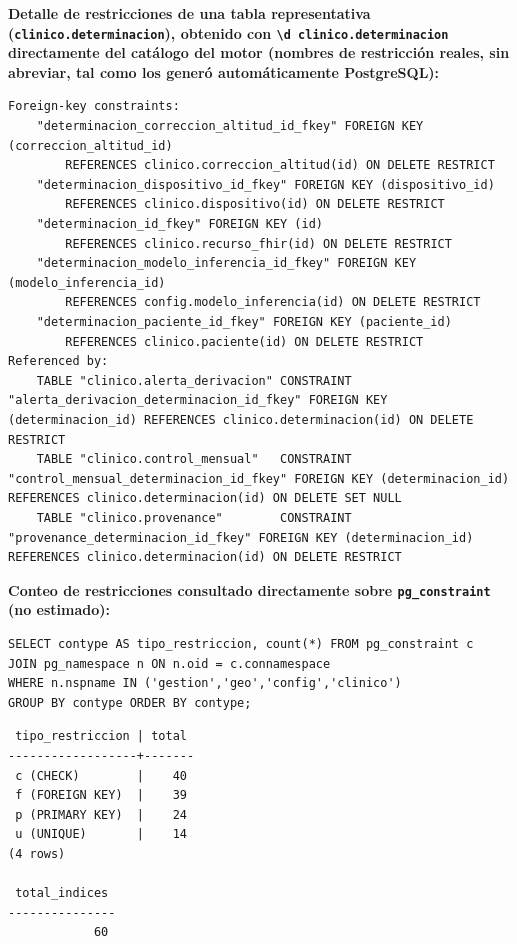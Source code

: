 \documentclass[11pt,a4paper]{article}
\begin{document}
\textbf{Detalle de restricciones de una tabla representativa (\texttt{clinico.determinacion}), obtenido con \texttt{\textbackslash{}d\ clinico.determinacion} directamente del catálogo del motor (nombres de restricción reales, sin abreviar, tal como los generó automáticamente PostgreSQL):}

\begin{samepage}\begin{verbatim}
Foreign-key constraints:
    "determinacion_correccion_altitud_id_fkey" FOREIGN KEY (correccion_altitud_id)
        REFERENCES clinico.correccion_altitud(id) ON DELETE RESTRICT
    "determinacion_dispositivo_id_fkey" FOREIGN KEY (dispositivo_id)
        REFERENCES clinico.dispositivo(id) ON DELETE RESTRICT
    "determinacion_id_fkey" FOREIGN KEY (id)
        REFERENCES clinico.recurso_fhir(id) ON DELETE RESTRICT
    "determinacion_modelo_inferencia_id_fkey" FOREIGN KEY (modelo_inferencia_id)
        REFERENCES config.modelo_inferencia(id) ON DELETE RESTRICT
    "determinacion_paciente_id_fkey" FOREIGN KEY (paciente_id)
        REFERENCES clinico.paciente(id) ON DELETE RESTRICT
Referenced by:
    TABLE "clinico.alerta_derivacion" CONSTRAINT "alerta_derivacion_determinacion_id_fkey" FOREIGN KEY (determinacion_id) REFERENCES clinico.determinacion(id) ON DELETE RESTRICT
    TABLE "clinico.control_mensual"   CONSTRAINT "control_mensual_determinacion_id_fkey" FOREIGN KEY (determinacion_id) REFERENCES clinico.determinacion(id) ON DELETE SET NULL
    TABLE "clinico.provenance"        CONSTRAINT "provenance_determinacion_id_fkey" FOREIGN KEY (determinacion_id) REFERENCES clinico.determinacion(id) ON DELETE RESTRICT
\end{verbatim}\end{samepage}

\textbf{Conteo de restricciones consultado directamente sobre \texttt{pg\_constraint} (no estimado):}

\begin{samepage}\begin{verbatim}
SELECT contype AS tipo_restriccion, count(*) FROM pg_constraint c
JOIN pg_namespace n ON n.oid = c.connamespace
WHERE n.nspname IN ('gestion','geo','config','clinico')
GROUP BY contype ORDER BY contype;
\end{verbatim}\end{samepage}

\begin{samepage}\begin{verbatim}
 tipo_restriccion | total
------------------+-------
 c (CHECK)        |    40
 f (FOREIGN KEY)  |    39
 p (PRIMARY KEY)  |    24
 u (UNIQUE)       |    14
(4 rows)

 total_indices
---------------
            60
\end{verbatim}\end{samepage}
\end{document}
